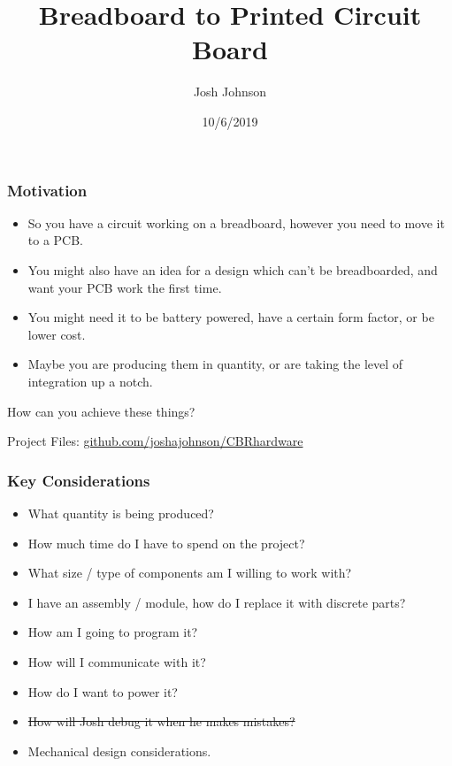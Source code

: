 \documentclass[t]{beamer}
\title[]{Breadboard to Printed Circuit Board} %
\author{Josh Johnson} %
\institute[] %
{ \\ %
\medskip
\textit{} %
}
\date{10/6/2019} %
\begin{document}
\begin{frame}
\titlepage %
\end{frame}



\begin{frame}
\frametitle{Motivation}
\begin{itemize}
	\item So you have a circuit working on a breadboard, however you need to move it to a PCB.
	\item You might also have an idea for a design which can't be breadboarded, and want your PCB work the first time.
	\item You might need it to be battery powered, have a certain form factor, or be lower cost.
	\item Maybe you are producing them in quantity, or are taking the level of integration up a notch.
\end{itemize}
\vspace{3mm}
How can you achieve these things? 



\vspace{15mm}
Project Files: \url{github.com/joshajohnson/CBRhardware}\\
\end{frame}


\begin{frame}[t]
\frametitle{Key Considerations}

\begin{itemize}
	\item What quantity is being produced?
	\item How much time do I have to spend on the project?
	\item What size / type of components am I willing to work with?
	\item I have an assembly / module, how do I replace it with discrete parts?
	\item How am I going to program it?
	\item How will I communicate with it?
	\item How do I want to power it?
	\item \sout{How will Josh debug it when he makes mistakes?} 
	\item Mechanical design considerations. 
\end{itemize}

\end{frame}
\end{document}
